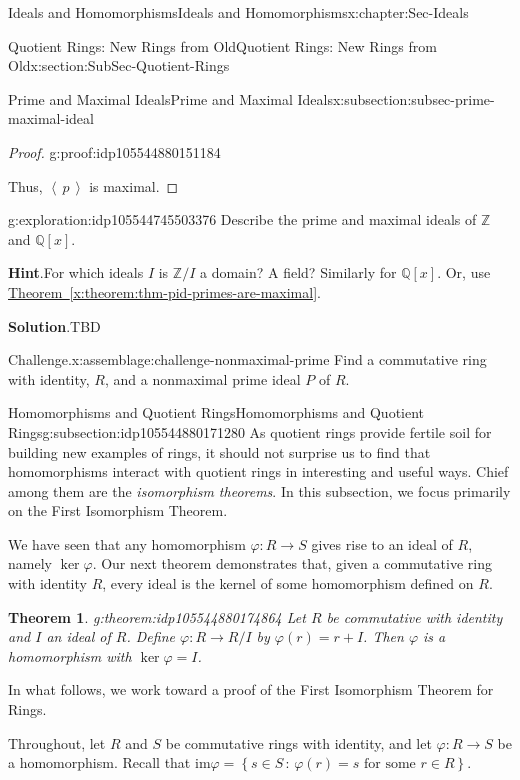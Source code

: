 \documentclass[oneside,10pt,]{book}
\newcommand{\blocktitlefont}{\relax}
\newcommand{\xreffont}{\relax}
\numberwithin{equation}{section}
\newcommand{\ideal}[1]{\left\langle\, #1 \,\right\rangle}
\def\p{\varphi}
\def\im{\text{im}}
\newcommand{\setof}[2]{{\left\{#1\,\colon\,#2\right\}}}
\def\Z{{\mathbb Z}}
\def\Q{{\mathbb Q}}
\newtheorem{theorem}{Theorem}[section]
\begin{document}
\begin{chapterptx}{Ideals and Homomorphisms}{}{Ideals and Homomorphisms}{}{}{x:chapter:Sec-Ideals}
\begin{sectionptx}{Quotient Rings: New Rings from Old}{}{Quotient Rings: New Rings from Old}{}{}{x:section:SubSec-Quotient-Rings}
\begin{subsectionptx}{Prime and Maximal Ideals}{}{Prime and Maximal Ideals}{}{}{x:subsection:subsec-prime-maximal-ideal}
\begin{proof}{}{g:proof:idp105544880151184}
\par
Thus, \(\ideal{p}\) is maximal.%
\end{proof}
\begin{exploration}{}{g:exploration:idp105544745503376}%
Describe the prime and maximal ideals of \(\Z\) and \(\Q[x]\).%
\par\smallskip%
\noindent\textbf{\blocktitlefont Hint}.\hypertarget{g:hint:idp105544745504912}{}\quad{}For which ideals \(I\) is \(\Z/I\) a domain? A field? Similarly for \(\Q[x]\). Or, use \hyperref[x:theorem:thm-pid-primes-are-maximal]{Theorem~{\xreffont\ref{x:theorem:thm-pid-primes-are-maximal}}}.\par\smallskip%
\noindent\textbf{\blocktitlefont Solution}.\hypertarget{g:solution:idp105544880166800}{}\quad{}TBD\end{exploration}%
\begin{assemblage}{Challenge.}{x:assemblage:challenge-nonmaximal-prime}%
Find a commutative ring with identity, \(R\), and a nonmaximal prime ideal \(P\) of \(R\).%
\end{assemblage}
\end{subsectionptx}
%
%
\typeout{************************************************}
\typeout{************************************************}
%
\begin{subsectionptx}{Homomorphisms and Quotient Rings}{}{Homomorphisms and Quotient Rings}{}{}{g:subsection:idp105544880171280}
As quotient rings provide fertile soil for building new examples of rings, it should not surprise us to find that homomorphisms interact with quotient rings in interesting and useful ways. Chief among them are the \emph{isomorphism theorems}. In this subsection, we focus primarily on the First Isomorphism Theorem.%
\par
We have seen that any homomorphism \(\p : R\to S\) gives rise to an ideal of \(R\), namely \(\ker\p\). Our next theorem demonstrates that, given a commutative ring with identity \(R\), every ideal is the kernel of some homomorphism defined on \(R\).%
\begin{theorem}{}{}{g:theorem:idp105544880174864}%
Let \(R\) be commutative with identity and \(I\) an ideal of \(R\). Define \(\p: R\to R/I\) by \(\p(r) = r+I\). Then \(\p\) is a homomorphism with \(\ker\p = I\).%
\end{theorem}
In what follows, we work toward a proof of the First Isomorphism Theorem for Rings.%
\par
Throughout, let \(R\) and \(S\) be commutative rings with identity, and let \(\p : R\to S\) be a homomorphism. Recall that \(\im \p = \setof{s\in S}{\p(r) = s\text{ for some } r\in R}\).%

\end{subsectionptx}
\end{sectionptx}
\end{chapterptx}
\end{document}

